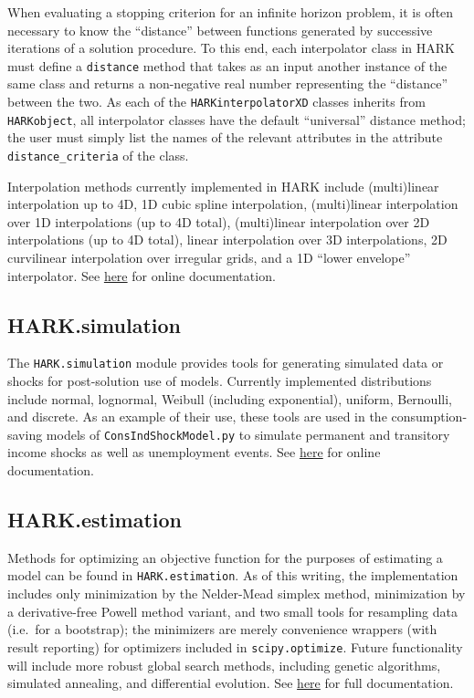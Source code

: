 \documentclass[12pt,titlepage,letterpaper]{econtex}
\begin{document}
{When evaluating a stopping criterion for an infinite horizon problem, it is often necessary to know the ``distance'' between functions generated by successive iterations of a solution procedure.  To this end, each interpolator class in HARK must define a \texttt{distance} method that takes as an input another instance of the same class and returns a non-negative real number representing the ``distance'' between the two.  As each of the \texttt{HARKinterpolatorXD} classes inherits from \texttt{HARKobject}, all interpolator classes have the default ``universal'' distance method; the user must simply list the names of the relevant attributes in the attribute \texttt{distance\_criteria} of the class.

Interpolation methods currently implemented in HARK include (multi)linear interpolation up to 4D, 1D cubic spline interpolation, (multi)linear interpolation over 1D interpolations (up to 4D total), (multi)linear interpolation over 2D interpolations (up to 4D total), linear interpolation over 3D interpolations, 2D curvilinear interpolation over irregular grids, and a 1D ``lower envelope'' interpolator.  See \href{https://econ-ark.github.io/HARK/generated/HARKinterpolation.html}{here} for online documentation.

\subsection{HARK.simulation}\label{sec:HARKsimulation}

The \texttt{HARK.simulation} module provides tools for generating simulated data or shocks for post-solution use of models.  Currently implemented distributions include normal, lognormal, Weibull (including exponential), uniform, Bernoulli, and discrete.  As an example of their use, these tools are used in the consumption-saving models of \texttt{ConsIndShockModel.py} to simulate permanent and transitory income shocks as well as unemployment events.  See \href{https://econ-ark.github.io/HARK/generated/HARKsimulation.html}{here} for online documentation.

\subsection{HARK.estimation}\label{sec:HARKestimation}

Methods for optimizing an objective function for the purposes of estimating a model can be found in \texttt{HARK.estimation}.  As of this writing, the implementation includes only minimization by the Nelder-Mead simplex method, minimization by a derivative-free Powell method variant, and two small tools for resampling data (i.e.\ for a bootstrap); the minimizers are merely convenience wrappers (with result reporting) for optimizers included in \texttt{scipy.optimize}.  Future functionality will include more robust global search methods, including genetic algorithms, simulated annealing, and differential evolution.  See \href{https://econ-ark.github.io/HARK/generated/HARKestimation.html}{here} for full documentation.

}
\end{document}
